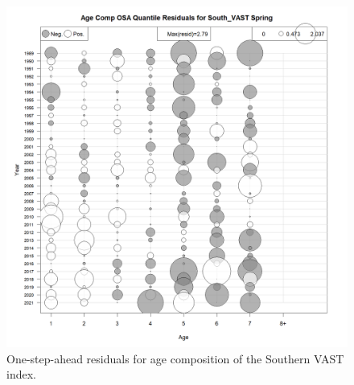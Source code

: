 \documentclass[
]{article}
\begin{document}
\begin{figure}

{\centering \includegraphics[width=1\linewidth]{../2023.RT.Runs/Run34/plots_png/diagnostics/Catch_age_comp_osa_resids_South_VAST_Spring} 

}

\caption{One-step-ahead residuals for age composition of the Southern VAST index.}\label{fig:osa-South-vast-paa}
\end{figure}
\end{document}
